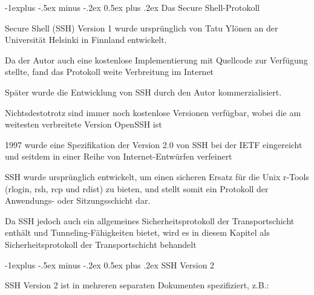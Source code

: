 \documentclass[a4paper]{article}
\makeatletter
\renewcommand{\subsection}{\@startsection{subsection}{2}{0mm}%
 {-1explus -.5ex minus -.2ex}%
 {0.5ex plus .2ex}%
 {\normalfont\normalsize\bfseries}}
\makeatother
\begin{document}
\begin{multicols}{3}
\begin{itemize*}
            \subsection{Das Secure
                  Shell-Protokoll}

            \begin{itemize*}
                  \item
                  Secure Shell (SSH) Version 1 wurde ursprünglich von Tatu Ylönen an der
                  Universität Helsinki in Finnland entwickelt.
                  \item
                  Da der Autor auch eine kostenlose Implementierung mit Quellcode zur
                  Verfügung stellte, fand das Protokoll weite Verbreitung im Internet
                  \item
                  Später wurde die Entwicklung von SSH durch den Autor kommerzialisiert.
                  \item
                  Nichtsdestotrotz sind immer noch kostenlose Versionen verfügbar, wobei
                  die am weitesten verbreitete Version OpenSSH ist
                  \item
                  1997 wurde eine Spezifikation der Version 2.0 von SSH bei der IETF
                  eingereicht und seitdem in einer Reihe von Internet-Entwürfen
                  verfeinert
                  \item
                  SSH wurde ursprünglich entwickelt, um einen sicheren Ersatz für die
                  Unix r-Tools (rlogin, rsh, rcp und rdist) zu bieten, und stellt somit
                  ein Protokoll der Anwendungs- oder Sitzungsschicht dar.
                  \item
                  Da SSH jedoch auch ein allgemeines Sicherheitsprotokoll der
                  Transportschicht enthält und Tunneling-Fähigkeiten bietet, wird es in
                  diesem Kapitel als Sicherheitsprotokoll der Transportschicht behandelt
            \end{itemize*}


            \subsection{SSH Version 2}

            \begin{itemize*}
                  \item
                  SSH Version 2 ist in mehreren separaten Dokumenten spezifiziert, z.B.:


\end{itemize*}
\end{itemize*}
\end{multicols}
\end{document}
